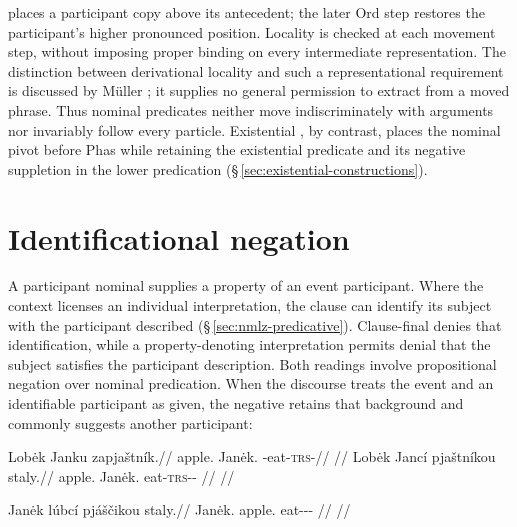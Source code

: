  places a participant copy above its antecedent; the later Ord step restores
 the participant's higher pronounced position. Locality is checked at each
 movement step, without imposing proper binding on every intermediate
 representation. The distinction between derivational locality and such a
 representational requirement is discussed by Müller \cite[§1]{mueller2000};
 it supplies no general permission to extract from a moved phrase.
 Thus nominal predicates
 neither move indiscriminately with arguments nor invariably follow every
 particle. Existential , by contrast, places the nominal
 pivot before Phas while retaining the existential predicate and its negative
 suppletion in the lower predication (§\,\ref{sec:existential-constructions}).

\section{Identificational negation}\label{sec:negative-identificational-constructions}\label{sec:vm-ident-neg}
A participant nominal supplies a property of an event participant. Where
the context licenses an individual interpretation, the clause can identify
its subject with the participant described
(§\,\ref{sec:nmlz-predicative}). Clause-final  denies that
identification, while a property-denoting interpretation permits denial that
the subject satisfies the participant description. Both readings involve
propositional negation over nominal predication.
When the discourse treats the event and an identifiable participant as given,
the negative retains that background and commonly suggests another participant:

\pex
\a
\begingl
\gla Lobėk Janku zapjaštník.//
\glb apple.\Dir{} Janėk.\Trs{} \Neg{}-eat-\textsc{trs}-\Pf{}//
\glft {}
//
\endgl
\a
\begingl
\gla Lobėk Jancí pjaštníkou staly.//
\glb apple.\Dir{} Janėk.\Ind{} eat-\textsc{trs}-\Pf{}-\Nmlz{} \Neg{}//
\glft {}
//
\endgl
\xe

\pex
\a
\begingl
\gla Janėk lúbcí pjáščikou staly.//
\glb Janėk.\Dir{} apple.\Ind{} eat-\Antip{}-\Pf{}-\Nmlz{} \Neg{}//
\glft {}
//
\endgl
\xe

